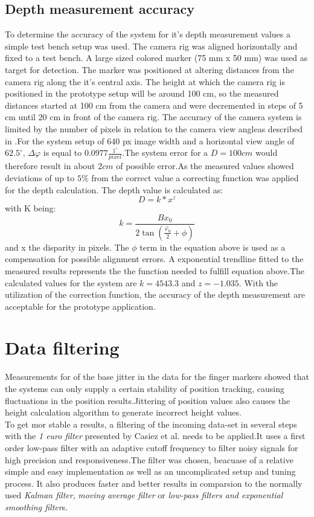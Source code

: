 \subsection{Depth measurement accuracy}
To determine the accuracy of the system for it's depth measurement values a simple test bench setup was used. The camera rig was aligned horizontally and fixed to a test bench. A large sized colored marker (75 mm x 50 mm) was used as target for detection. The marker was positioned at altering distances from the camera rig along the it's central axis. The height at which the camera rig is positioned in the prototype setup will be around 100 cm, so the measured distances started at 100 cm from the camera and were decremented in steps of 5 cm until 20 cm in front of the camera rig.
The accuracy of the camera system is limited by the number of pixels in relation to the camera view angleas described in \cite{JernejMrovlje.2008}.For the system setup of 640 px image width and a horizontal view angle of $62.5^\circ$, $\Delta\varphi$ is equal to $0.0977\frac{1^\circ}{pixel}$.The system error for a $D=100cm$ would therefore result in about $2cm$ of possible error.As the measured values showed deviations of up to $5\%$ from the correct value a correcting function \cite{ManafA.Mahammed.2013} was applied for the depth calculation. The depth value is calculated as:
\begin{equation}
\label{equ:power_function}
D=k*x^{z}
\end{equation}
with K being:
\begin{equation}
k=\frac{Bx_0}{2\tan(\frac{\varphi_0}{2}+\phi)}
\end{equation}
and x the disparity in pixels.
The $\phi$ term in the equation above is used as a compensation for possible alignment errors.
A exponential trendline fitted to the measured results represents the the function needed to fulfill equation above.The calculated values for the system are $k=4543.3$ and $z=-1.035$.
With the utilization of the correction function, the accuracy of the depth measurement are acceptable for the prototype application.
\section{Data filtering}
Measurements for of the base jitter in the data for the finger markers showed that the systems can only supply a certain stability of position tracking, causing fluctuations in the position results.Jittering of position values also causes the height calculation algorithm to generate incorrect height values.\\
To get mor stable a results, a filtering of the incoming data-set in several steps with the \textit{1 euro filter} presented by Casiez et al. \cite{Casiez.2012} needs to be applied.It uses a first order low-pass filter with an adaptive cutoff frequency to filter noisy signals for high precision and responsiveness.The filter was chosen, beacuase of a relative simple and easy implementation as well as an uncomplicated setup and tuning process. It also produces faster and better results in comparsion to the normally used \textit{Kalman filter}\cite{Welch.2001}, \textit{moving average filter} or \textit{low-pass filters and exponential smoothing filter}s\cite{LaViola.2003}.
